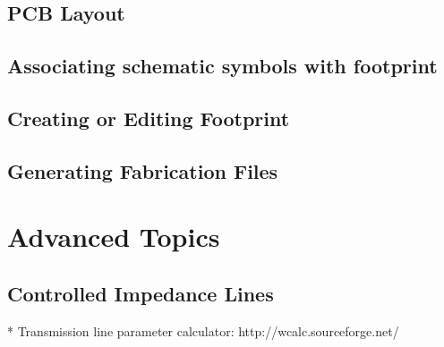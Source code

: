 \documentclass[12pt,letterpaper]{scrartcl}
\begin{document}
\subsection{PCB Layout}
\subsection{Associating schematic symbols with footprint}
\subsection{Creating or Editing Footprint}
\subsection{Generating Fabrication Files}

\section{Advanced Topics}

\subsection{Controlled Impedance Lines}

* Transmission line parameter calculator: http://wcalc.sourceforge.net/

\newpage



\end{document}
